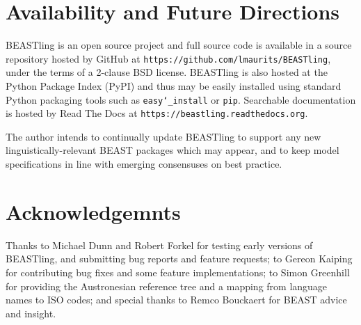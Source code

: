 \documentclass[twocolumn,10pt]{scrartcl}
\begin{document}
\section{Availability and Future Directions}

BEASTling is an open source project and full source code is available in a source repository hosted by GitHub at \texttt{https://github.com/lmaurits/BEASTling}, under the terms of a 2-clause BSD license.  BEASTling is also hosted at the Python Package Index (PyPI) and thus may be easily installed using standard Python packaging tools such as \texttt{easy\char`_install} or \texttt{pip}.  Searchable documentation is hosted by Read The Docs at \texttt{https://beastling.readthedocs.org}.

The author intends to continually update BEASTling to support any new linguistically-relevant BEAST packages which may appear, and to keep model specifications in line with emerging consensuses on best practice.

\section{Acknowledgemnts}

Thanks to Michael Dunn and Robert Forkel for testing early versions of BEASTling, and submitting bug reports and feature requests; to Gereon Kaiping for contributing bug fixes and some feature implementations; to Simon Greenhill for providing the Austronesian reference tree and a mapping from language names to ISO codes; and special thanks to Remco Bouckaert for BEAST advice and insight.




\end{document}
